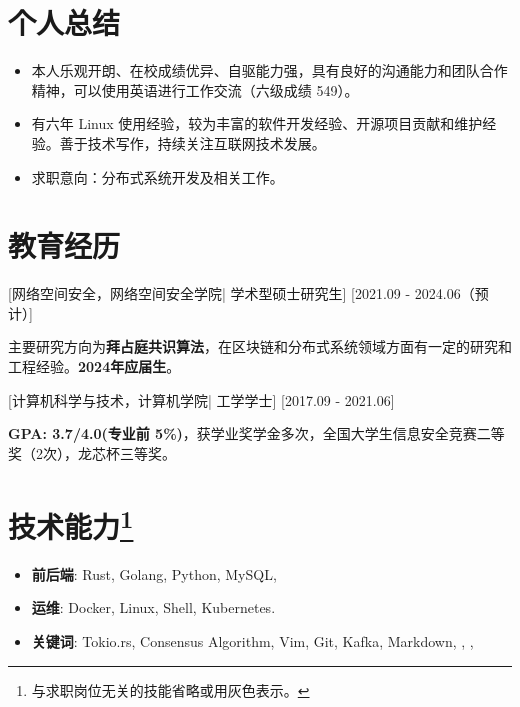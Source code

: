 \documentclass{resume}
\begin{document}


\ResumeTitle

\section{个人总结}

\begin{itemize}
  \item 本人乐观开朗、在校成绩优异、自驱能力强，具有良好的沟通能力和团队合作精神，可以使用英语进行工作交流（六级成绩 549）。
  \item 有六年 Linux 使用经验，较为丰富的软件开发经验、开源项目贡献和维护经验。善于技术写作，持续关注互联网技术发展。
  \item 求职意向：分布式系统开发及相关工作。
\end{itemize}

\section{教育经历}
[\textnormal{网络空间安全，网络空间安全学院|}  学术型硕士研究生]
[2021.09 - 2024.06（预计）]

主要研究方向为\textbf{拜占庭共识算法}，在区块链和分布式系统领域方面有一定的研究和工程经验。\textbf{2024年应届生}。

[\textnormal{计算机科学与技术，计算机学院|} 工学学士]
[2017.09 - 2021.06]

\textbf{GPA: 3.7/4.0(专业前 5\%)}，获学业奖学金多次，全国大学生信息安全竞赛二等奖（2次），龙芯杯三等奖。


\section[技术能力]{技术能力\protect\footnote{与求职岗位无关的技能省略或用灰色表示。}}
\begin{itemize}
  \item \textbf{前后端}: Rust, Golang, Python, MySQL, 
  \item \textbf{运维}: Docker, Linux, Shell, Kubernetes.
  \item \textbf{关键词}: Tokio.rs, Consensus Algorithm, Vim, Git, Kafka, Markdown, , \GrayText{\LaTeX}, 
\end{itemize}
\end{document}
